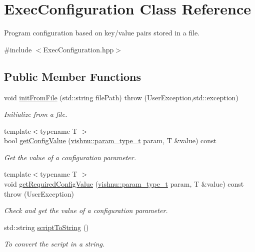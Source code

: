 \hypertarget{classExecConfiguration}{
\section{ExecConfiguration Class Reference}
\label{classExecConfiguration}
}


Program configuration based on key/value pairs stored in a file.  




{\ttfamily \#include $<$ExecConfiguration.hpp$>$}

\subsection*{Public Member Functions}
\begin{DoxyCompactItemize}
\item 
void \hyperlink{classExecConfiguration_acc0689c976ae6c48f88b3156bea802c1}{initFromFile} (std::string filePath)  throw (UserException,std::exception)
\begin{DoxyCompactList}\small\item\em Initialize from a file. \item\end{DoxyCompactList}\item 
{\footnotesize template$<$typename T $>$ }\\bool \hyperlink{classExecConfiguration_a6642ffe0f41262c3b0188723c2c7ee14}{getConfigValue} (\hyperlink{namespacevishnu_afa06c1bb0b3442d83acb7650e8df75d1}{vishnu::param\_\-type\_\-t} param, T \&value) const 
\begin{DoxyCompactList}\small\item\em Get the value of a configuration parameter. \item\end{DoxyCompactList}\item 
{\footnotesize template$<$typename T $>$ }\\void \hyperlink{classExecConfiguration_abbfae5b4cf60595866016107c66e02ee}{getRequiredConfigValue} (\hyperlink{namespacevishnu_afa06c1bb0b3442d83acb7650e8df75d1}{vishnu::param\_\-type\_\-t} param, T \&value) const   throw (UserException)
\begin{DoxyCompactList}\small\item\em Check and get the value of a configuration parameter. \item\end{DoxyCompactList}\item 
\hypertarget{classExecConfiguration_a051728d6c1118fa523ac71e6b64abecc}{
std::string \hyperlink{classExecConfiguration_a051728d6c1118fa523ac71e6b64abecc}{scriptToString} ()}
\label{classExecConfiguration_a051728d6c1118fa523ac71e6b64abecc}

\begin{DoxyCompactList}\small\item\em To convert the script in a string. \item\end{DoxyCompactList}\end{DoxyCompactItemize}
